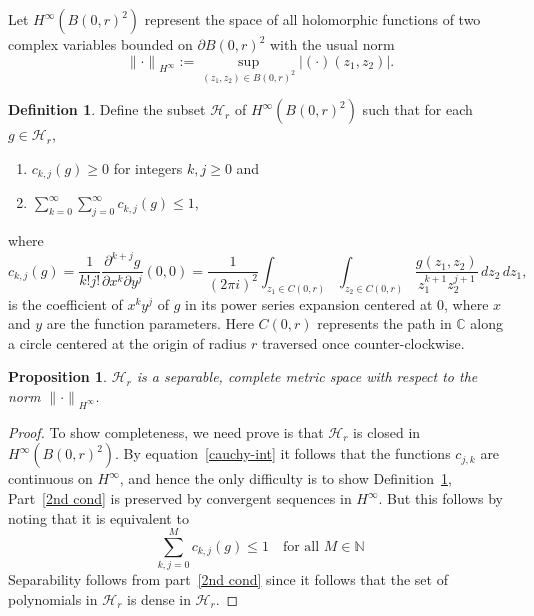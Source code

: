 \documentclass[12pt]{amsart}
\theoremstyle{plain}
\newtheorem{prop}[thm]{Proposition}
\theoremstyle{definition}
\newtheorem{defn}[thm]{Definition}
\theoremstyle{remark}
\theoremstyle{definition}
\begin{document}
Let $H^\infty(B(0,r)^2)$ represent the space of all holomorphic functions of two complex variables bounded on $\partial B(0,r)^2$ with the usual norm
\begin{equation}
{\| \cdot \|}_{H^\infty} := \sup_{(z_1,z_2) \in B(0,r)^2} |(\cdot)(z_1,z_2)|.
\end{equation}

\begin{defn}
\label{defn H}
Define the subset $\mathcal{H}_r$ of $H^\infty(B(0,r)^2)$ such that for each $g \in \mathcal{H}_r$,
\begin{enumerate}
\item $c_{k,j}(g) \geq 0$ for integers $k,j \geq 0$ and
\item \label{2nd cond} $\displaystyle \sum_{k=0}^\infty \sum_{j=0}^\infty c_{k,j}(g) \le 1$,
\end{enumerate}
where
\begin{equation}
\label{cauchy-int}
c_{k,j}(g) = \frac{1}{k!j!}\frac{\partial^{k+j}g}{\partial x^k \partial y^j}(0,0) = \frac{1}{(2\pi i)^2} \int_{z_1 \in C(0,r)} \int_{z_2 \in C(0,r)} \frac{g(z_1,z_2)}{z_1^{k+1}z_2^{j+1}}\,dz_2 \, dz_1,
\end{equation}
is the coefficient of $x^k y^j$ of $g$ in its power series expansion centered at 0, where $x$ and $y$ are the function parameters.  Here $C(0,r)$ represents the path in $\mathbb C$ along a circle centered at the origin of radius $r$ traversed once counter-clockwise.
\end{defn}

\begin{prop}
$\mathcal{H}_r$ is a separable, complete metric space with respect to the norm ${\|\cdot\|}_{H^\infty}$.
\end{prop}

\begin{proof}
To show completeness, we need prove is that $\mathcal{H}_r$ is closed in $H^\infty(B(0,r)^2)$.    By equation~\eqref{cauchy-int} it follows that the functions $c_{j,k}$ are continuous on $H^\infty$, and hence the only difficulty is to show Definition~\ref{defn H}, Part~\eqref{2nd cond} is preserved by convergent sequences in $H^\infty$.  But this follows by noting that it is equivalent to
\begin{equation}
\sum_{k,j=0}^M c_{k,j}(g) \leq 1 \quad\text{for all $M \in \mathbb N$}
\end{equation}
Separability follows from part~\eqref{2nd cond} since it follows that the set of polynomials in $\mathcal{H}_r$ is dense in $\mathcal{H}_r$.
\end{proof}
\end{document}
